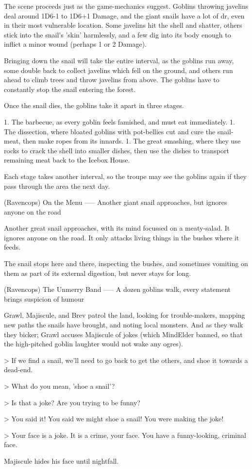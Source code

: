 The scene proceeds just as the game-mechanics suggest.
Goblins throwing javelins deal around 1D6-1 to 1D6+1 Damage, and the giant snails have a lot of \gls{dr}, even in their most vulnerable location.
Some javelins hit the shell and shatter, others stick into the snail's 'skin' harmlessly, and a few dig into its body enough to inflict a minor wound (perhaps 1 or 2 Damage).

Bringing down the snail will take the entire \gls{interval}, as the goblins run away, some double back to collect javelins which fell on the ground, and others run ahead to climb trees and throw javelins from above.
The goblins have to constantly stop the snail entering the forest.

Once the snail dies,
the goblins take it apart in three stages.

1. The barbecue, as every goblin feels famished, and must eat immediately.
1. The dissection, where bloated goblins with pot-bellies cut and cure the snail-meat, then make ropes from its innards.
1. The great smashing, where they use rocks to crack the shell into smaller dishes, then use the dishes to transport remaining meat back to the Icebox House.

Each stage takes another \gls{interval}, so the troupe may see the goblins again if they pass through the area the next day.

(Ravencops) On the Menu
-----
{Another giant snail approaches, but ignores anyone on the road}

Another great snail approaches, with its mind focussed on a meaty-salad.
It ignores anyone on the road.
It only attacks living things in the bushes where it feeds.

The snail stops here and there, inspecting the bushes, and sometimes vomiting on them as part of its external digestion, but never stays for long.


(Ravencops) The Unmerry Band
-----
{A dozen goblins walk, every statement brings suspicion of humour}

Grawl, Majiscule, and Brev patrol the land, looking for trouble-makers, mapping new paths the snails have brought, and noting local monsters.
And as they walk they bicker; Grawl accuses Majiscule of jokes (which MindElder banned, so that the high-pitched goblin laughter would not wake any ogres).

> If we find a snail, we'll need to go back to get the others, and shoe it towards a dead-end.

> What do you mean, 'shoe a snail'?

> Is that a joke?  Are you trying to be funny?

> You said it!  You said we might shoe a snail!  You were making the joke!

> Your face is a joke.  It is a crime, your face.  You have a funny-looking, criminal face.

Majiscule hides his face until nightfall.
